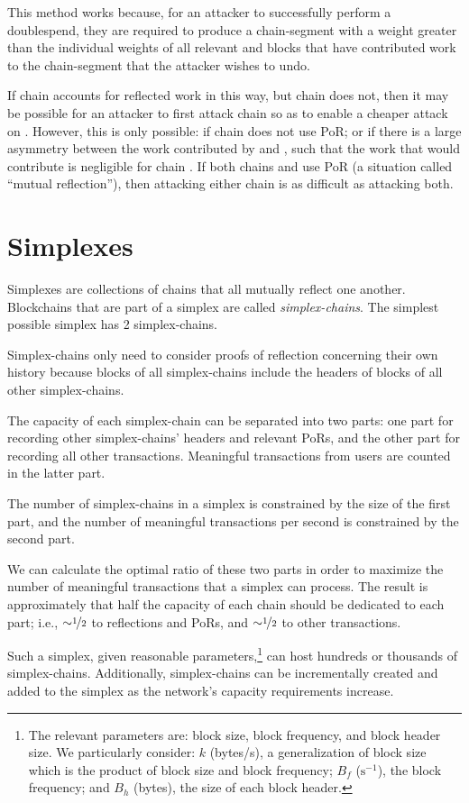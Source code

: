 \documentclass[a4paper,]{article}
\begin{document}
This method works because, for an attacker to successfully perform a doublespend, they are required to produce a chain-segment with a weight greater than the individual weights of all relevant \cL and \cR blocks that have contributed work to the chain-segment that the attacker wishes to undo.

If chain \cL accounts for reflected work in this way, but chain \cR does not, then it may be possible for an attacker to first attack chain \cR so as to enable a cheaper attack on \cL.
However, this is only possible: if chain \cR does not use PoR; or if there is a large asymmetry between the work contributed by \cL and \cR, such that the work that \cL would contribute is negligible for chain \cR.
If both chains \cL and \cR use PoR (a situation called ``mutual reflection''), then attacking either chain is as difficult as attacking both.

\section{Simplexes}

Simplexes are collections of chains that all mutually reflect one another.
Blockchains that are part of a simplex are called \emph{simplex-chains}.
The simplest possible simplex has 2 simplex-chains.

Simplex-chains only need to consider proofs of reflection concerning their own history because blocks of all simplex-chains include the headers of blocks of all other simplex-chains.

The capacity of each simplex-chain can be separated into two parts: one part for recording other simplex-chains' headers and relevant PoRs, and the other part for recording all other transactions.
Meaningful transactions from users are counted in the latter part.

The number of simplex-chains in a simplex is constrained by the size of the first part, and the number of meaningful transactions per second is constrained by the second part.

We can calculate the optimal ratio of these two parts in order to maximize the number of meaningful transactions that a simplex can process.
The result is approximately that half the capacity of each chain should be dedicated to each part; i.e., $\sim\half$ to reflections and PoRs, and $\sim\half$ to other transactions.

Such a simplex, given reasonable parameters,\footnote{
  The relevant parameters are: block size, block frequency, and block header size.
  We particularly consider: $k$ (bytes/s), a generalization of block size which is the product of block size and block frequency; $B_f$ ($\text{s}^{-1}$), the block frequency; and $B_h$ (bytes), the size of each block header.
} can host hundreds or thousands of simplex-chains.
Additionally, simplex-chains can be incrementally created and added to the simplex as the network's capacity requirements increase.
\end{document}
